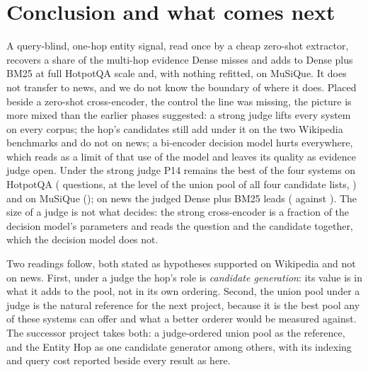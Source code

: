 \section{Conclusion and what comes next}
\label{sec:conclusion}

A query-blind, one-hop entity signal, read once by a cheap zero-shot extractor, recovers a share of
the multi-hop evidence Dense misses and adds to Dense plus BM25 at full HotpotQA scale and, with
nothing refitted, on MuSiQue. It does not transfer to news, and we do not know the boundary of
where it does. Placed beside a zero-shot cross-encoder, the control the line was missing, the
picture is more mixed than the earlier phases suggested: a strong judge lifts every system on every
corpus; the hop's candidates still add under it on the two Wikipedia benchmarks and do not on news;
a bi-encoder decision model hurts everywhere, which reads as a limit of that use of the model and
leaves its quality as evidence judge open. Under the strong judge P14 remains the best of the
four systems on HotpotQA (\fsStrongPFourteenHotpot{} questions, at the level of the union pool
of all four candidate lists, \fsStrongUnionHotpot{}) and on MuSiQue
(\fsStrongPFourteenMusique{}); on news the judged Dense plus BM25 leads
(\fsStrongPTenBMultihop{} against \fsStrongPFourteenMultihop{}). The size of a judge is not
what decides: the strong cross-encoder is a fraction of the decision model's parameters and
reads the question and the candidate together, which the decision model does not.

Two readings follow, both stated as hypotheses supported on Wikipedia and not on news. First,
under a judge the hop's role is \emph{candidate generation}: its value is in what it adds to the
pool, not in its own ordering. Second, the union pool under a judge is the natural reference for
the next project, because it is the best pool any of these systems can offer and what a better
orderer would be measured against. The successor project takes both: a judge-ordered union pool as
the reference, and the Entity Hop as one candidate generator among others, with its
indexing and query cost reported beside every result as here.
